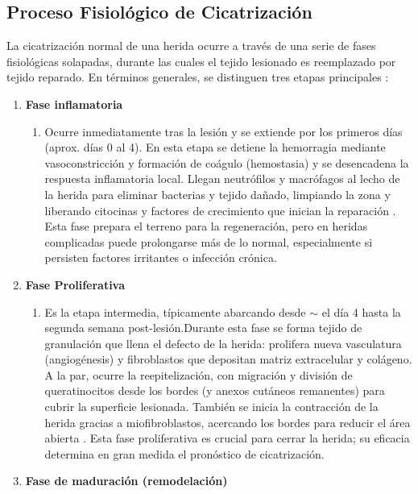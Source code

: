 \subsection{Proceso Fisiológico de Cicatrización}

La cicatrización normal de una herida ocurre a través de una serie de fases fisiológicas solapadas, durante las cuales el tejido lesionado es reemplazado por tejido reparado. En términos generales, se distinguen tres etapas principales \cite{ulcerasCicatrizacixF3nxDAlcerasnet}:
\begin{enumerate}
    \item \textbf{Fase inflamatoria}
    \begin{enumerate}
        \item Ocurre inmediatamente tras la lesión y se extiende por los primeros días (aprox. días 0 al 4). En esta etapa se detiene la hemorragia mediante vasoconstricción y formación de coágulo (hemostasia) y se desencadena la respuesta inflamatoria local. Llegan neutrófilos y macrófagos al lecho de la herida para eliminar bacterias y tejido dañado, limpiando la zona y liberando citocinas y factores de crecimiento que inician la reparación \cite{ulcerasCicatrizacixF3nxDAlcerasnet}. Esta fase prepara el terreno para la regeneración, pero en heridas complicadas puede prolongarse más de lo normal, especialmente si persisten factores irritantes o infección crónica.
    \end{enumerate}
    \item \textbf{Fase Proliferativa}
    \begin{enumerate}
        \item Es la etapa intermedia, típicamente abarcando desde  $\sim$ el día 4 hasta la segunda semana post-lesión.Durante esta fase se forma tejido de granulación que llena el defecto de la herida: prolifera nueva vasculatura (angiogénesis) y fibroblastos que depositan matriz extracelular y colágeno. A la par, ocurre la reepitelización, con migración y división de queratinocitos desde los bordes (y anexos cutáneos remanentes) para cubrir la superficie lesionada. También se inicia la contracción de la herida gracias a miofibroblastos, acercando los bordes para reducir el área abierta \cite{ulcerasCicatrizacixF3nxDAlcerasnet}. Esta fase proliferativa es crucial para cerrar la herida; su eficacia determina en gran medida el pronóstico de cicatrización.
    \end{enumerate}
    \item \textbf{Fase de maduración (remodelación)}
    \begin{enumerate}

\end{enumerate}
\end{enumerate}
